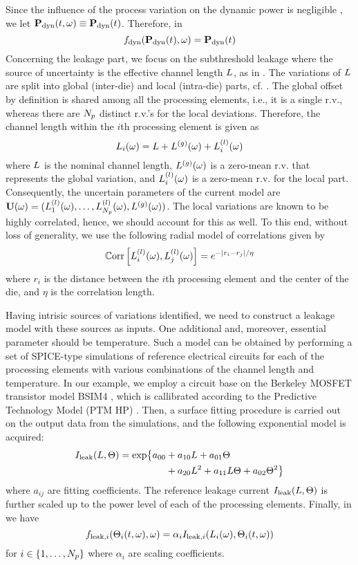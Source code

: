 Since the influence of the process variation on the dynamic power is negligible \cite{juan2012, srivastava2010}, we let $\mathbf{P}_{\text{dyn}}(t, \omega) \equiv \mathbf{P}_{\text{dyn}}(t)$. Therefore, in 
\[
  f_{\text{dyn}}(\mathbf{P}_{\text{dyn}}(t), \omega) = \mathbf{P}_{\text{dyn}}(t)
\]
Concerning the leakage part, we focus on the subthreshold leakage where the source of uncertainty is the effective channel length $L$, as in \cite{juan2012}. The variations of $L$ are split into global (inter-die) and local (intra-die) parts, cf. \cite{juan2012, srivastava2010, shen2009}. The global offset by definition is shared among all the processing elements, i.e., it is a single r.v., whereas there are ${N_p}$ distinct r.v.'s for the local deviations. Therefore, the channel length within the $i$th processing element is given as
\[
  L_i(\omega) = L + {L^{(g)}}(\omega) + L^{(l)}_i(\omega)
\]
where $L$ is the nominal channel length, ${L^{(g)}}(\omega)$ is a zero-mean r.v. that represents the global variation, and $L^{(l)}_i(\omega)$ is a zero-mean r.v. for the local part. Consequently, the uncertain parameters of the current model are $\mathbf{U}(\omega) = (L^{(l)}_1(\omega), \dotsc, L^{(l)}_{N_p}(\omega), {L^{(g)}}(\omega) )$. The local variations are known to be highly correlated, hence, we should account for this as well. To this end, without loss of generality, we use the following radial model of correlations \cite{ghanem1991} given by
\begin{equation} \elabel{covariance}
  \oCorr{\lLeff_i(\o), \lLeff_j(\o)} = e^{-|r_i - r_j|/\eta}
\end{equation}
where $r_i$ is the distance between the $i$th processing element and the center of the die, and $\eta$ is the correlation length.

Having intrisic sources of variations identified, we need to construct a leakage model with these sources as inputs. One additional and, moreover, essential parameter should be temperature. Such a model can be obtained by performing a set of SPICE-type simulations of reference electrical circuits for each of the processing elements with various combinations of the channel length and temperature. In our example, we employ a circuit base on the Berkeley MOSFET transistor model BSIM4 \cite{bsim4}, which is callibrated according to the Predictive Technology Model (PTM HP) \cite{ptm}. Then, a surface fitting procedure is carried out on the output data from the simulations, and the following exponential model is acquired:
\begin{align} \elabel{leakage-current}
  I_\leak(\Leff, \T) = \text{exp} \big\{ a_{00} & + a_{10} \Leff + a_{01} \T \\
  & {} + a_{20} \Leff^2 + a_{11} \Leff \T + a_{02} \T^2 \big\} \nonumber
\end{align}
where $a_{ij}$ are fitting coefficients. The reference leakage current $I_{\text{leak}}(L, \Theta)$ is further scaled up to the power level of each of the processing elements. Finally, in  we have
\[
  f_{\text{leak}, i}(\Theta_i(t, \omega), \omega) = \alpha_i I_{\text{leak}, i}(L_i(\omega), \Theta_i(t, \omega))
\]
for $i \in \{ 1, \dotsc, {N_p} \}$ where $\alpha_i$ are scaling coefficients.
